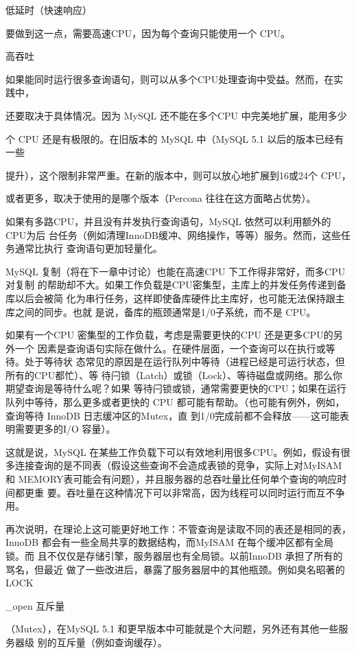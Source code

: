 低延时（快速响应）

要做到这一点，需要高速CPU，因为每个查询只能使用一个 CPU。

高吞吐

如果能同时运行很多查询语句，则可以从多个CPU处理查询中受益。然而，在实践中，

还要取决于具体情况。因为 MySQL 还不能在多个CPU 中完美地扩展，能用多少

个 CPU 还是有极限的。在旧版本的 MySQL 中（MySQL 5.1 以后的版本已经有一些

提升），这个限制非常严重。在新的版本中，则可以放心地扩展到16或24个 CPU，

或者更多，取决于使用的是哪个版本（Percona 往往在这方面略占优势）。

如果有多路CPU，并且没有并发执行查询语句，MySQL 依然可以利用额外的CPU为后
台任务（例如清理InnoDB缓冲、网络操作，等等）服务。然而，这些任务通常比执行
查询语句更加轻量化。

MySQL 复制（将在下一章中讨论）也能在高速CPU 下工作得非常好，而多CPU 对复制
的帮助却不大。如果工作负载是CPU密集型，主库上的并发任务传递到备库以后会被简
化为串行任务，这样即使备库硬件比主库好，也可能无法保持跟主库之间的同步。也就
是说，备库的瓶颈通常是1/0子系统，而不是 CPU。

如果有一个CPU 密集型的工作负载，考虑是需要更快的CPU 还是更多CPU的另外一个
因素是查询语句实际在做什么。在硬件层面，一个查询可以在执行或等待。处于等待状
态常见的原因是在运行队列中等待（进程已经是可运行状态，但所有的CPU都忙）、等
待闩锁（Latch）或锁（Lock）、等待磁盘或网络。那么你期望查询是等待什么呢？如果
等待闩锁或锁，通常需要更快的CPU；如果在运行队列中等待，那么更多或者更快的
CPU 都可能有帮助。（也可能有例外，例如，查询等待 InnoDB 日志缓冲区的Mutex，直
到1/0完成前都不会释放——这可能表明需要更多的I/O 容量）。

这就是说，MySQL 在某些工作负载下可以有效地利用很多CPU。例如，假设有很
多连接查询的是不同表（假设这些查询不会造成表锁的竞争，实际上对MyISAM和
MEMORY表可能会有问题），并且服务器的总吞吐量比任何单个查询的响应时间都更重
要。吞吐量在这种情况下可以非常高，因为线程可以同时运行而互不争用。

再次说明，在理论上这可能更好地工作：不管查询是读取不同的表还是相同的表，
InnoDB 都会有一些全局共享的数据结构，而MyISAM 在每个缓冲区都有全局锁。而
且不仅仅是存储引擎，服务器层也有全局锁。以前InnoDB 承担了所有的骂名，但最近
做了一些改进后，暴露了服务器层中的其他瓶颈。例如臭名昭著的LOCK

\_open 互斥量

（Mutex），在MySQL 5.1 和更早版本中可能就是个大问题，另外还有其他一些服务器级
别的互斥量（例如查询缓存）。

